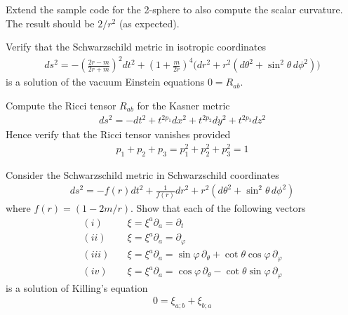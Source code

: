 \documentclass[a4paper,12pt]{article}
\numberwithin{equation}{section}%
\begin{document}
\begin{Exercises}
   \begin{Exercise}
      Extend the sample code for the 2-sphere to also compute the scalar curvature.
      The result should be $2/r^2$ (as expected).
   \end{Exercise}

   \begin{Exercise}
      Verify that the Schwarzschild metric in isotropic coordinates
      \begin{align*}
         ds^2 = - \left(\frac{2r-m}{2r+m}\right)^2 dt^2
                + \left(1+\frac{m}{2r}\right)^4
                  \Big( dr^2 + r^2\left(d\theta^2 + \sin^2\theta\, d\phi^2\right)\Big)
      \end{align*}
      is a solution of the vacuum Einstein equations $0=R_{ab}$.
   \end{Exercise}

   \begin{Exercise}
      Compute the Ricci tensor $R_{ab}$ for the Kasner metric
      \begin{align*}
         ds^2 = -dt^2 + t^{2p_1} dx^2 + t^{2p_2} dy^2 + t^{2p_3} dz^2
      \end{align*}
      Hence verify that the Ricci tensor vanishes provided
      \begin{align*}
         p_1 + p_2 + p_3 = p^2_1 + p^2_2 +p^2_3 = 1
      \end{align*}
   \end{Exercise}

   \begin{Exercise}
      Consider the Schwarzschild metric in Schwarzschild coordinates
      \begin{align*}
         ds^2 = - f(r) dt^2
                + \frac{1}{f(r)} dr^2
                + r^2\left(d\theta^2 + \sin^2\theta\, d\phi^2\right)
      \end{align*}
      where $f(r) = (1-2m/r)$. Show that each of the following vectors
      \begin{align*}
         (i)   \quad & \xi = \xi^{a}\partial_{a} = \partial_{t}\\
         (ii)  \quad & \xi = \xi^{a}\partial_{a} = \partial_{\varphi}\\
         (iii) \quad & \xi = \xi^{a}\partial_{a}
                           = \sin\varphi\, \partial_{\theta}
                             + \cot\theta \cos\varphi\, \partial_{\varphi}\\
         (iv)  \quad & \xi = \xi^{a}\partial_{a}
                           = \cos\varphi\, \partial_{\theta}
                             - \cot\theta \sin\varphi\, \partial_{\varphi}
      \end{align*}
      is a solution of Killing's equation
      \begin{align*}
         0 = \xi_{a;b} + \xi_{b;a}
      \end{align*}


\end{Exercise}
\end{Exercises}
\end{document}

